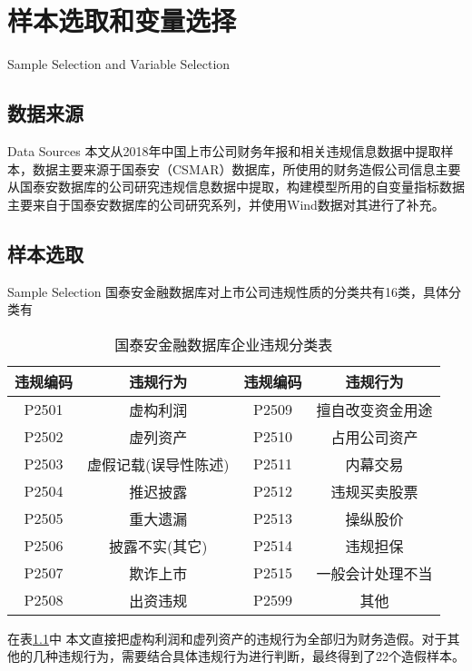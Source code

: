 \chapter{样本选取和变量选择}{Sample Selection and Variable Selection}

\section{数据来源}{Data Sources}
本文从2018年中国上市公司财务年报和相关违规信息数据中提取样本，数据主要来源于国泰安（CSMAR）数据库，所使用的财务造假公司信息主要从国泰安数据库的公司研究违规信息数据中提取，构建模型所用的自变量指标数据主要来自于国泰安数据库的公司研究系列，并使用Wind数据对其进行了补充。

\section{样本选取}{Sample Selection}
国泰安金融数据库对上市公司违规性质的分类共有16类，具体分类有
\begin{table}[!ht]
	\centering
	\begin{threeparttable}[b]
		\footnotesize
		\caption{国泰安金融数据库企业违规分类表}
	\begin{tabular}{cc|cc}
		\toprule
	违规编码  & 违规行为        & 违规编码  & 违规行为     \\ \bottomrule
	P2501 & 虚构利润        & P2509 & 擅自改变资金用途 \\
	P2502 & 虚列资产        & P2510 & 占用公司资产   \\
	P2503 & 虚假记载(误导性陈述) & P2511 & 内幕交易     \\
	P2504 & 推迟披露        & P2512 & 违规买卖股票   \\
	P2505 & 重大遗漏        & P2513 & 操纵股价     \\
	P2506 & 披露不实(其它)    & P2514 & 违规担保     \\
	P2507 & 欺诈上市        & P2515 & 一般会计处理不当 \\
	P2508 & 出资违规        & P2599 & 其他       \\ \bottomrule
	\end{tabular}
	\label{Fraud_type}
\end{threeparttable}
\end{table}

在表\ref{Fraud_type}中
本文直接把虚构利润和虚列资产的违规行为全部归为财务造假\cite{Research-on-Corporate-Financial-Fraud-Identific-ation-Model-Based-on-Data-Mining}。对于其他的几种违规行为，需要结合具体违规行为进行判断，最终得到了22个造假样本。

